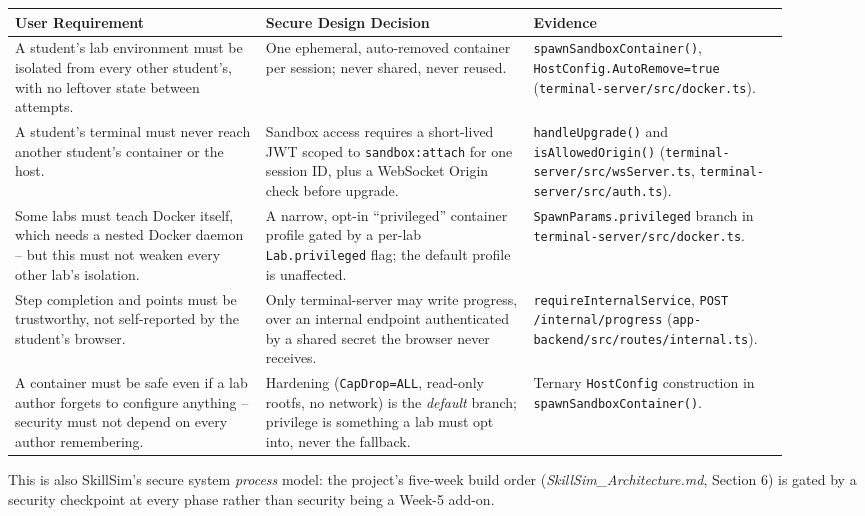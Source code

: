 \documentclass[11pt]{article}
\begin{document}
\begin{longtable}{@{}p{0.30\linewidth}p{0.32\linewidth}p{0.28\linewidth}@{}}
\toprule
\textbf{User Requirement} & \textbf{Secure Design Decision} & \textbf{Evidence} \\
\midrule
\endhead
A student's lab environment must be isolated from every other
student's, with no leftover state between attempts. &
One ephemeral, auto-removed container per session; never shared,
never reused. &
\texttt{spawnSandboxContainer()},
\texttt{HostConfig.AutoRemove=true}
(\texttt{terminal-server/src/docker.ts}). \\
A student's terminal must never reach another student's container or
the host. &
Sandbox access requires a short-lived JWT scoped to
\texttt{sandbox:attach} for one session ID, plus a WebSocket Origin
check before upgrade. &
\texttt{handleUpgrade()} and \texttt{isAllowedOrigin()}
(\texttt{terminal-server/src/wsServer.ts},
\texttt{terminal-server/src/auth.ts}). \\
Some labs must teach Docker itself, which needs a nested Docker
daemon -- but this must not weaken every other lab's isolation. &
A narrow, opt-in ``privileged'' container profile gated by a
per-lab \texttt{Lab.privileged} flag; the default profile is
unaffected. &
\texttt{SpawnParams.privileged} branch in
\texttt{terminal-server/src/docker.ts}. \\
Step completion and points must be trustworthy, not self-reported
by the student's browser. &
Only terminal-server may write progress, over an internal endpoint
authenticated by a shared secret the browser never receives. &
\texttt{requireInternalService}, \texttt{POST /internal/progress}
(\texttt{app-backend/src/routes/internal.ts}). \\
A container must be safe even if a lab author forgets to configure
anything -- security must not depend on every author remembering. &
Hardening (\texttt{CapDrop=ALL}, read-only rootfs, no network) is the
\emph{default} branch; privilege is something a lab must opt into,
never the fallback. &
Ternary \texttt{HostConfig} construction in
\texttt{spawnSandboxContainer()}. \\
\bottomrule
\end{longtable}

This is also SkillSim's secure system \emph{process} model: the
project's five-week build order (\emph{SkillSim\_Architecture.md},
Section 6) is gated by a security checkpoint at every phase rather
than security being a Week-5 add-on.
\end{document}
